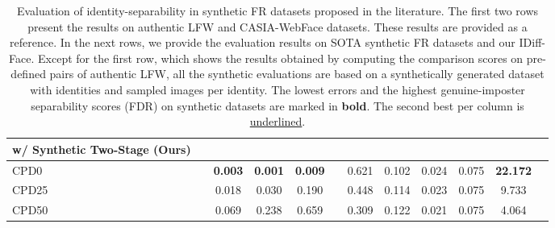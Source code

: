 \documentclass[10pt,twocolumn,letterpaper]{article}
\newcommand{\cacpdzeroshort}{CPD0 }
\newcommand{\cacpdtwentyfiveshort}{CPD25 }
\newcommand{\cacpdfiftyshort}{CPD50 }
\newcommand{\approachnamewithoutspace}{IDiff-Face}
\begin{document}
\begin{table}[t]
{\begin{tabular}{@{}lccccccccccc@{}}
    \cmidrule{1-1} \cmidrule{3-5} \cmidrule{7-12}\textbf{w/ Synthetic Two-Stage (Ours)} &&&&&&&&&&& \\
    \midrule
    {\cacpdzeroshort} && \textbf{0.003}   &  \textbf{0.001}  &  \textbf{0.009}  &&  0.621  &  0.102  &  0.024  &  0.075  &  \textbf{22.172}  \\
    {\cacpdtwentyfiveshort}  &&  0.018  &  0.030  &  0.190  &&  0.448  &  0.114  &  0.023  &  0.075  &  9.733  \\
    {\cacpdfiftyshort}  &&  0.069  &  0.238  &  0.659  &&  0.309  &  0.122  &  0.021 &  0.075  &  4.064  \\
    
    \bottomrule
    \end{tabular}
}
\vspace{-3mm}
\caption{Evaluation of identity-separability in synthetic FR datasets proposed in the literature.
The first two rows present the results on authentic LFW and CASIA-WebFace datasets. These results are provided as a reference. In the next rows, we provide the evaluation results on SOTA synthetic FR datasets and our \approachnamewithoutspace.
Except for the first row, which shows the results obtained by computing the comparison scores on pre-defined pairs of authentic LFW, all the synthetic evaluations are based on a synthetically generated dataset with  identities and  sampled images per identity. The lowest errors and the highest genuine-imposter separability scores (FDR) on synthetic datasets are marked in \textbf{bold}. The second best per column is \underline{underlined}. }
\label{tab:related_models_metrics_table}
\vspace{-2mm}
\end{table}
\end{document}
